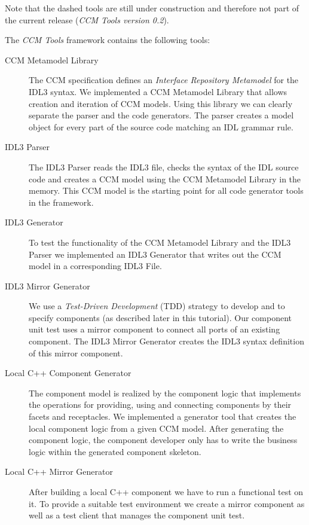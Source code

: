 Note that the dashed tools are still under construction and therefore not part
of the current release ({\it CCM Tools version 0.2}).


\newpage
\noindent
The {\it CCM Tools} framework contains the following tools:

\begin{description}
\item [CCM Metamodel Library]
The CCM specification defines an {\it Interface Repository Metamodel} for the
IDL3 syntax. We implemented a CCM Metamodel Library that allows creation and
iteration of CCM models. Using this library we can clearly separate the parser
and the code generators. The parser creates a model object for every part of the
source code matching an IDL grammar rule.

\item [IDL3 Parser]
The IDL3 Parser reads the IDL3 file, checks the syntax of the IDL source code
and creates a CCM model using the CCM Metamodel Library in the memory. This CCM
model is the starting point for all code generator tools in the framework.

\item [IDL3 Generator]
To test the functionality of the CCM Metamodel Library and the IDL3 Parser we
implemented an IDL3 Generator that writes out the CCM model in a corresponding
IDL3 File.

\item [IDL3 Mirror Generator]
We use a {\it Test-Driven Development} (TDD) strategy to develop and to specify
components (as described later in this tutorial). Our component unit test uses a
mirror component to connect all ports of an existing component. The IDL3 Mirror
Generator creates the IDL3 syntax definition of this mirror component.

\item [Local C++ Component Generator]
The component model is realized by the component logic that implements the
operations for providing, using and connecting components by their facets and
receptacles. We implemented a generator tool that creates the local component
logic from a given CCM model. After generating the component logic, the
component developer only has to write the business logic within the generated
component skeleton.

\item [Local C++ Mirror Generator]
After building a local C++ component we have to run a functional test on it. To
provide a suitable test environment we create a mirror component as well as a
test client that manages the component unit test.


\end{description}
